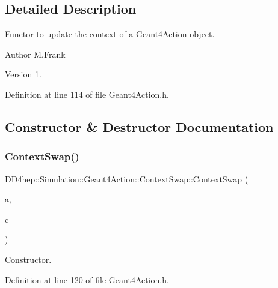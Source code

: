 \subsection{Detailed Description}
Functor to update the context of a \hyperlink{class_d_d4hep_1_1_simulation_1_1_geant4_action}{Geant4\+Action} object. 

\begin{DoxyAuthor}{Author}
M.\+Frank 
\end{DoxyAuthor}
\begin{DoxyVersion}{Version}
1. 
\end{DoxyVersion}


Definition at line 114 of file Geant4\+Action.\+h.



\subsection{Constructor \& Destructor Documentation}
\hypertarget{class_d_d4hep_1_1_simulation_1_1_geant4_action_1_1_context_swap_a671e15a7c4487dea998af2e002aa78d6}{}\label{class_d_d4hep_1_1_simulation_1_1_geant4_action_1_1_context_swap_a671e15a7c4487dea998af2e002aa78d6} 
\subsubsection{\texorpdfstring{Context\+Swap()}{ContextSwap()}}
{\footnotesize\ttfamily D\+D4hep\+::\+Simulation\+::\+Geant4\+Action\+::\+Context\+Swap\+::\+Context\+Swap (\begin{DoxyParamCaption}\item[{\hyperlink{class_d_d4hep_1_1_simulation_1_1_geant4_action}{Geant4\+Action} $\ast$}]{a,  }\item[{\hyperlink{class_d_d4hep_1_1_simulation_1_1_geant4_context}{Geant4\+Context} $\ast$}]{c }\end{DoxyParamCaption})\hspace{0.3cm}{\ttfamily [inline]}}



Constructor. 



Definition at line 120 of file Geant4\+Action.\+h.



